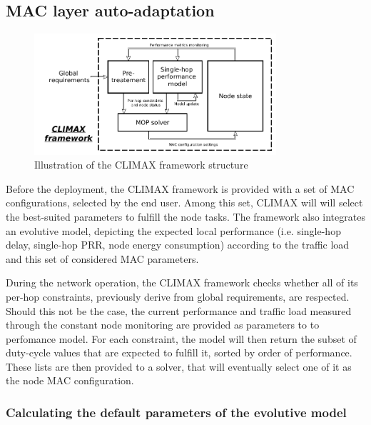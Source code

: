 \documentclass[12pt,journal,compsoc]{IEEEtran}
\begin{document}

\subsection{MAC layer auto-adaptation}

\begin{figure}[t]
	\begin{centering}
	\includegraphics[width=0.8\textwidth]{figs/CLIMAX.png}
	\caption{Illustration of the CLIMAX framework structure}
	\label{core_climax}
	\end{centering}
\end{figure}

Before the deployment, the CLIMAX framework is provided with a set of MAC configurations, selected by the end user. Among this set, CLIMAX will will select the best-suited parameters to fulfill the node tasks. The framework also integrates an evolutive model, depicting the expected local performance (i.e. single-hop delay, single-hop PRR, node energy consumption) according to the traffic load and this set of considered MAC parameters.

During the network operation, the CLIMAX framework checks whether all of its per-hop constraints, previously derive from global requirements, are respected. Should this not be the case, the current performance and traffic load measured through the constant node monitoring are provided as parameters to to perfomance model. For each constraint, the model will then return the subset of duty-cycle values that are expected to fulfill it, sorted by order of performance. These lists are then provided to a solver, that will eventually select one of it as the node MAC configuration.

\subsubsection{Calculating the default parameters of the evolutive model}
\end{document}
